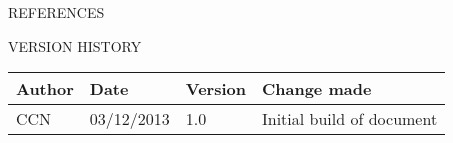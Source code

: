 \documentclass{article}
\newcommand{\versionhistory}{
		\begin{tabularx}{\linewidth}{| p{2cm} | p{2cm} | p{2cm} | X | }
			\hline
			\bf{Author} & \bf{Date} & \bf{Version} & \bf{Change made} \\
			\hline
			CCN & 03/12/2013 & 1.0 & Initial build of document \\
			\hline
		\end{tabularx}
}
\begin{document}
	\nocite{LaTeXTemplate} %
	\nocite{LaTeXListings}
	\nocite{LaTeXListings2}

	\newpage
	\begin{section}{REFERENCES}
		
		
	\end{section}
	
	\vspace{1cm}
	\begin{section}{VERSION HISTORY}
		\versionhistory
	\end{section}
\end{document}
